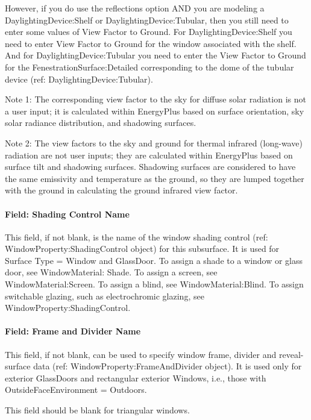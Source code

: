 However, if you do use the reflections option AND you are modeling a DaylightingDevice:Shelf or DaylightingDevice:Tubular, then you still need to enter some values of View Factor to Ground. For DaylightingDevice:Shelf you need to enter View Factor to Ground for the window associated with the shelf. And for DaylightingDevice:Tubular you need to enter the View Factor to Ground for the FenestrationSurface:Detailed corresponding to the dome of the tubular device (ref: DaylightingDevice:Tubular).

Note 1: The corresponding view factor to the sky for diffuse solar radiation is not a user input; it is calculated within EnergyPlus based on surface orientation, sky solar radiance distribution, and shadowing surfaces.

Note 2: The view factors to the sky and ground for thermal infrared (long-wave) radiation are not user inputs; they are calculated within EnergyPlus based on surface tilt and shadowing surfaces. Shadowing surfaces are considered to have the same emissivity and temperature as the ground, so they are lumped together with the ground in calculating the ground infrared view factor.

\paragraph{Field: Shading Control Name}\label{field-shading-control-name-2}

This field, if not blank, is the name of the window shading control (ref: WindowProperty:ShadingControl object) for this subsurface. It is used for Surface Type = Window and GlassDoor. To assign a shade to a window or glass door, see WindowMaterial: Shade. To assign a screen, see WindowMaterial:Screen. To assign a blind, see WindowMaterial:Blind. To assign switchable glazing, such as electrochromic glazing, see WindowProperty:ShadingControl.

\paragraph{Field: Frame and Divider Name}\label{field-frame-and-divider-name-2}

This field, if not blank, can be used to specify window frame, divider and reveal-surface data (ref: WindowProperty:FrameAndDivider object). It is used only for exterior GlassDoors and rectangular exterior Windows, i.e., those with OutsideFaceEnvironment = Outdoors.

This field should be blank for triangular windows.

